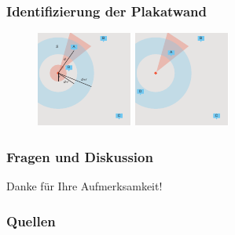 \documentclass{beamer}
\begin{document}
\begin{frame}
    \frametitle{Identifizierung der Plakatwand}
    \begin{figure}
        \centering
        \begin{minipage}{.5\linewidth}
            \centering
            \includegraphics[width=.9\linewidth]{images/billboard_identification_3}
        \end{minipage}%
        \begin{minipage}{.5\linewidth}
            \centering
            \includegraphics[width=.9\linewidth]{images/billboard_identification_4}       
        \end{minipage}
    \end{figure} 
\end{frame}

\begin{frame}
    \frametitle{Fragen und Diskussion}
    Danke für Ihre Aufmerksamkeit!
\end{frame}

\begin{frame}[allowframebreaks]
    \frametitle{Quellen}
    \printbibliography{}    
\end{frame}
\end{document}
